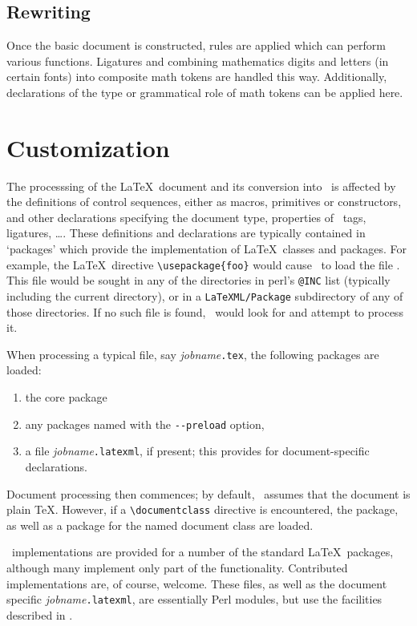 \documentclass{report}
\begin{document}
\section{Rewriting}\label{architecture.rewriting}
Once the basic document is constructed,  rules are applied which can
perform various functions. Ligatures and combining mathematics digits and letters (in certain fonts)
into composite math tokens are handled this way.  Additionally, declarations
of the type or grammatical role of math tokens can be applied here.


\chapter{Customization}\label{customization}
The processsing of the \LaTeX\ document and its  conversion into \XML\ is affected
by the definitions of control sequences, either as macros, primitives or constructors, 
and other declarations specifying the document type, properties of \XML\ tags, ligatures, \ldots.
These definitions and declarations are typically contained in `packages' which provide
the implementation of \LaTeX\ classes and packages.  For example, the \LaTeX\ directive
\verb|\usepackage{foo}| would cause \LaTeXML\ to load the file .
This file would be sought in any of the directories in perl's \verb|@INC| list (typically
including the current directory), or in a \verb|LaTeXML/Package| subdirectory of any of 
those directories.  If no such file is found, \LaTeXML\ would look for  and
attempt to process it.

When processing a typical file, say \textit{jobname}\texttt{.tex}, 
the following packages are loaded:
\begin{enumerate}
\item the core  package
\item any packages named with the \verb|--preload| option,
\item a file \textit{jobname}\texttt{.latexml}, if present;
      this provides for document-specific declarations.
\end{enumerate}
Document processing then commences; by default, \LaTeXML\ assumes that the document is plain \TeX.
However, if a \verb|\documentclass| directive is encountered, the  package, as well
as a package for the named document class are loaded.

\LaTeXML\ implementations are provided for a number of the standard \LaTeX\ packages,
although many implement only part of the functionality.  Contributed implementations are,
of course, welcome.  These files, as well as the document specific \textit{jobname}\texttt{.latexml},
are essentially Perl modules, but use the facilities described in .
\end{document}
